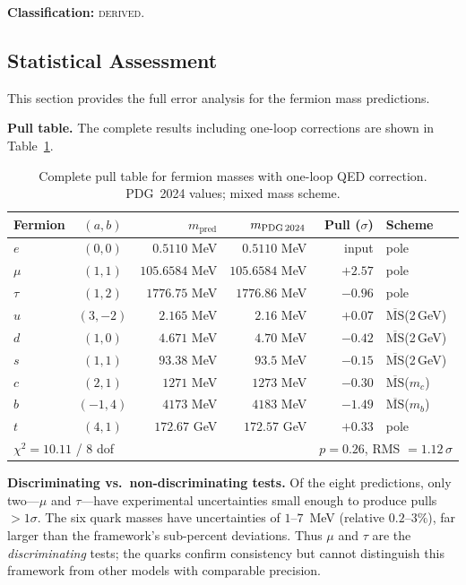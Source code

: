 \documentclass[12pt,a4paper]{article}
\theoremstyle{definition}
\begin{document}
\textbf{Classification:} \textsc{derived}.

\subsection{Statistical Assessment}
\label{sec:S-erroranalysis}

This section provides the full error analysis for the fermion mass predictions.

\textbf{Pull table.}  The complete results including one-loop corrections are shown in Table~\ref{tab:S-pulls}.

\begin{table}[H]
\centering
\begin{tabular}{lcrrrl}
\toprule
\textbf{Fermion} & $(a,b)$ & $m_{\text{pred}}$ & $m_{\text{PDG\,2024}}$ & \textbf{Pull ($\sigma$)} & \textbf{Scheme} \\
\midrule
$e$   & $(0,0)$  & $0.5110$ MeV  & $0.5110$ MeV  & input   & pole \\
$\mu$ & $(1,1)$  & $105.6584$ MeV& $105.6584$ MeV& $+2.57$ & pole \\
$\tau$& $(1,2)$  & $1776.75$ MeV & $1776.86$ MeV & $-0.96$ & pole \\
$u$   & $(3,-2)$ & $2.165$ MeV   & $2.16$ MeV    & $+0.07$ & $\overline{\text{MS}}$(2\,GeV) \\
$d$   & $(1,0)$  & $4.671$ MeV   & $4.70$ MeV    & $-0.42$ & $\overline{\text{MS}}$(2\,GeV) \\
$s$   & $(1,1)$  & $93.38$ MeV   & $93.5$ MeV    & $-0.15$ & $\overline{\text{MS}}$(2\,GeV) \\
$c$   & $(2,1)$  & $1271$ MeV    & $1273$ MeV    & $-0.30$ & $\overline{\text{MS}}$($m_c$) \\
$b$   & $(-1,4)$ & $4173$ MeV    & $4183$ MeV    & $-1.49$ & $\overline{\text{MS}}$($m_b$) \\
$t$   & $(4,1)$  & $172.67$ GeV  & $172.57$ GeV  & $+0.33$ & pole \\
\midrule
\multicolumn{4}{l}{$\chi^2 = 10.11$ / 8 dof} & \multicolumn{2}{l}{$p = 0.26$, RMS $= 1.12\,\sigma$} \\
\bottomrule
\end{tabular}
\caption{Complete pull table for fermion masses with one-loop QED correction.  PDG~2024 values; mixed mass scheme.}
\label{tab:S-pulls}
\end{table}

\textbf{Discriminating vs.\ non-discriminating tests.}  Of the eight predictions, only two---$\mu$ and $\tau$---have experimental uncertainties small enough to produce pulls $> 1\sigma$.  The six quark masses have uncertainties of $1$--$7$~MeV (relative $0.2$--$3\%$), far larger than the framework's sub-percent deviations.  Thus $\mu$ and $\tau$ are the \emph{discriminating} tests; the quarks confirm consistency but cannot distinguish this framework from other models with comparable precision.
\end{document}
